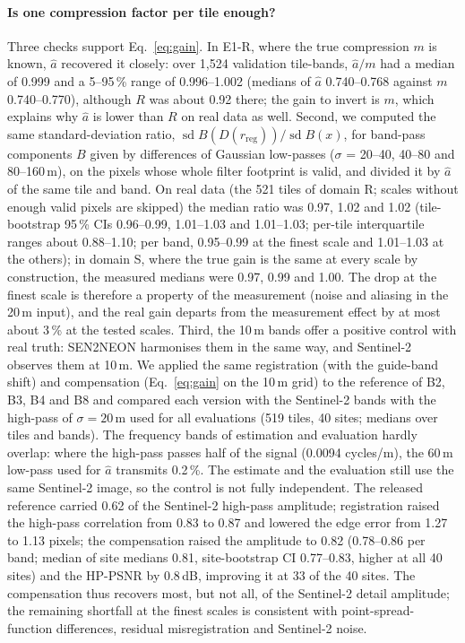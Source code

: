 \documentclass[pdflatex,sn-basic,referee,lineno]{sn-jnl}
\newcommand{\rreg}{r_{\mathrm{reg}}}
\begin{document}
\paragraph{Is one compression factor per tile enough?} Three checks support Eq.~\eqref{eq:gain}. In E1-R, where the true
compression $m$ is known, $\hat a$ recovered it closely: over 1,524 validation tile-bands, $\hat a/m$ had a median
of 0.999 and a 5--95\,\% range of 0.996--1.002 (medians of $\hat a$ 0.740--0.768 against $m$ 0.740--0.770),
although $R$ was about 0.92 there; the gain to invert is $m$, which explains
why $\hat a$ is lower than $R$ on real data as well. Second, we computed the same standard-deviation ratio, $\operatorname{sd}B(D(\rreg))/\operatorname{sd}B(x)$, for
band-pass components $B$ given by differences of Gaussian low-passes ($\sigma$ = 20--40, 40--80 and 80--160\,m), on
the pixels whose whole filter footprint is valid, and divided it by $\hat a$ of the same tile and band. On real data
(the 521 tiles of domain R; scales without enough valid pixels are skipped) the median
ratio was 0.97, 1.02 and 1.02 (tile-bootstrap 95\,\% CIs 0.96--0.99, 1.01--1.03 and 1.01--1.03; per-tile
interquartile ranges about 0.88--1.10; per band, 0.95--0.99 at the finest scale and 1.01--1.03 at the others); in
domain S, where the true gain is the same at every scale by construction, the measured medians were 0.97, 0.99 and
1.00. The drop at the finest scale is therefore a property of the measurement (noise and aliasing in the 20\,m input),
and the real gain departs from the measurement effect by at most about 3\,\% at the tested scales. Third, the 10\,m
bands offer a positive control with real truth: SEN2NEON harmonises them in the same way, and Sentinel-2 observes
them at 10\,m. We applied the same registration (with the guide-band shift) and compensation (Eq.~\ref{eq:gain} on
the 10\,m grid) to the reference of B2, B3, B4 and B8 and compared each version with the Sentinel-2 bands with the
high-pass of $\sigma=20$\,m used for all evaluations (519 tiles, 40 sites; medians over tiles and bands). The
frequency bands of estimation and evaluation hardly overlap: where the high-pass passes half of the signal
(0.0094 cycles/m), the 60\,m low-pass used for $\hat a$ transmits 0.2\,\%. The estimate and the evaluation still
use the same Sentinel-2 image, so the control is not fully independent. The released
reference carried 0.62 of the Sentinel-2 high-pass amplitude; registration raised the high-pass correlation from
0.83 to 0.87 and lowered the edge error from 1.27 to 1.13 pixels; the compensation raised the amplitude to 0.82
(0.78--0.86 per band; median of site medians 0.81, site-bootstrap CI 0.77--0.83, higher at all 40 sites) and the
HP-PSNR by 0.8\,dB, improving it at 33 of the 40 sites. The compensation thus recovers most, but not all, of the
Sentinel-2 detail amplitude; the remaining shortfall at the finest scales is
consistent with point-spread-function differences, residual misregistration and Sentinel-2 noise.
\end{document}
